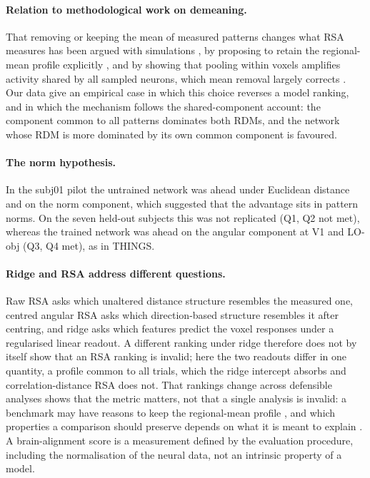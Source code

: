 \paragraph{Relation to methodological work on demeaning.}
That removing or keeping the mean of measured patterns changes what RSA measures has been argued with
simulations \citep{ramirez2017}, by proposing to retain the regional-mean profile explicitly
\citep{taylor2025}, and by showing that pooling within voxels amplifies activity shared by all sampled
neurons, which mean removal largely corrects \citep{bossio2025}. Our data give an empirical case in which
this choice reverses a model ranking, and in which the mechanism follows the shared-component account:
the component common to all patterns dominates both RDMs, and the network whose RDM is more dominated by
its own common component is favoured.

\paragraph{The norm hypothesis.}
In the subj01 pilot the untrained network was ahead under Euclidean distance and on the norm component,
which suggested that the advantage sits in pattern norms. On the seven held-out subjects this was not
replicated (Q1, Q2 not met), whereas the trained network was ahead on the angular component at V1 and
LO-obj (Q3, Q4 met), as in THINGS.

\paragraph{Ridge and RSA address different questions.}
Raw RSA asks which unaltered distance structure resembles the measured one, centred angular RSA asks which
direction-based structure resembles it after centring, and ridge asks which features predict the voxel
responses under a regularised linear readout. A different ranking under ridge therefore does not by itself
show that an RSA ranking is invalid; here the two readouts differ in one quantity, a profile common to all
trials, which the ridge intercept absorbs and correlation-distance RSA does not. That rankings change across
defensible analyses shows that the metric matters, not that a single analysis is invalid: a benchmark may have
reasons to keep the regional-mean profile \citep{taylor2025}, and which properties a comparison should
preserve depends on what it is meant to explain \citep{cao2024}. A brain-alignment score is a measurement
defined by the evaluation procedure, including the normalisation of the neural data, not an intrinsic
property of a model.

